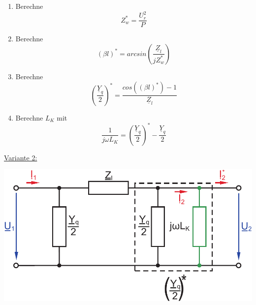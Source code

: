 \documentclass[a4paper,twocolumn,10pt]{article}
\begin{document}
\begin{enumerate}
\item Berechne
\begin{equation*}
Z_w^*=\frac{U_r^2}{P}
\end{equation*}
\item Berechne
\begin{equation*}
(\beta l)^*=arcsin\left(\frac{\underline{Z}_l}{jZ_w^*}\right)
\end{equation*}
\item Berechne
\begin{equation*}
\left(\frac{\underline{Y}_q}{2}\right)^*=\frac{cos\left((\beta l)^*\right)-1}{\underline{Z}_l}
\end{equation*}
\item Berechne $L_K$ mit
\begin{equation*}
\frac{1}{j\omega L_K}=\left(\frac{\underline{Y}_q}{2}\right)^*-\frac{\underline{Y}_q}{2}
\end{equation*}
\end{enumerate}
\underline{Variante 2:}
\begin{center}
\includegraphics[width=0.85\columnwidth]{Grafiken/Querkompensation_12}
\end{center}
\end{document}
